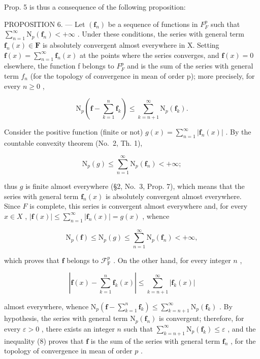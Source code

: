 Prop. 5 is thus a consequence of the following proposition:

PROPOSITION 6. --- Let \((\mathbf{f}_{n})\) be a sequence of functions in \(F_{F}^{p}\) such that \(\sum_{n=1}^{\infty}\mathrm{N}_{p}(\mathbf{f}_{n})<+\infty\) . Under these conditions, the series with general term \(\mathbf{f}_{n}(x)\in\mathbf{F}\) is absolutely convergent almost everywhere in X. Setting \(\mathbf{f}(x)=\sum_{n=1}^{\infty}\mathbf{f}_{n}(x)\) at the points where the series converges, and \(\mathbf{f}(x)=0\) elsewhere, the function f belongs to \(F_{F}^{p}\) and is the sum of the series with general term \(f_{n}\) (for the topology of convergence in mean of order p); more precisely, for every \(n\geqslant0\) ,

\[
\mathrm{N} _ {p} \left(\mathbf {f} - \sum_ {k = 1} ^ {n} \mathbf {f} _ {k}\right) \leqslant \sum_ {k = n + 1} ^ {\infty} \mathrm{N} _ {p} (\mathbf {f} _ {k}).\tag{8}
\]

Consider the positive function (finite or not) \(g(x) = \sum_{n=1}^{\infty} |\mathbf{f}_n(x)|\) . By the countable convexity theorem (No.~2, Th. 1),

\[
\mathrm{N} _ {p} (g) \leqslant \sum_ {n = 1} ^ {\infty} \mathrm{N} _ {p} (\mathbf {f} _ {n}) <   + \infty ;
\]

thus \(g\) is finite almost everywhere (§2, No.~3, Prop. 7), which means that the series with general term \(\mathbf{f}_n(x)\) is absolutely convergent almost everywhere. Since \(F\) is complete, this series is convergent almost everywhere and, for every \(x \in X\) , \(|\mathbf{f}(x)| \leqslant \sum_{n=1}^{\infty} |\mathbf{f}_n(x)| = g(x)\) , whence

\[
\mathrm{N} _ {p} (\mathbf {f}) \leqslant \mathrm{N} _ {p} (g) \leqslant \sum_ {n = 1} ^ {\infty} \mathrm{N} _ {p} (\mathbf {f} _ {n}) <   + \infty ,
\]

which proves that \(\mathbf{f}\) belongs to \(\mathcal{F}_{\mathrm{F}}^{p}\) . On the other hand, for every integer \(n\) ,

\[
\left| \mathbf {f} (x) - \sum_ {k = 1} ^ {n} \mathbf {f} _ {k} (x) \right| \leqslant \sum_ {k = n + 1} ^ {\infty} | \mathbf {f} _ {k} (x) |
\]

almost everywhere, whence \(\mathrm{N}_{p}\left(\mathbf{f}-\sum_{k=1}^{n}\mathbf{f}_{k}\right)\leqslant\sum_{k=n+1}^{\infty}\mathrm{N}_{p}(\mathbf{f}_{k})\) . By hypothesis, the series with general term \(\mathrm{N}_{p}(\mathbf{f}_{n})\) is convergent; therefore, for every \(\varepsilon > 0\) , there exists an integer \(n\) such that \(\sum_{k=n+1}^{\infty} \mathrm{N}_{p}(\mathbf{f}_{k}) \leqslant \varepsilon\) , and the inequality (8) proves that \(\mathbf{f}\) is the sum of the series with general term \(\mathbf{f}_{n}\) , for the topology of convergence in mean of order \(p\) .

